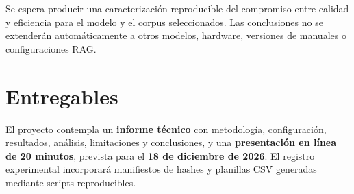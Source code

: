 \documentclass[11pt,a4paper]{article}
\begin{document}
Se espera producir una caracterización reproducible del compromiso entre calidad y eficiencia para el modelo y el corpus seleccionados. Las conclusiones no se extenderán automáticamente a otros modelos, hardware, versiones de manuales o configuraciones RAG.

\section{Entregables}
El proyecto contempla un \textbf{informe técnico} con metodología, configuración, resultados, análisis, limitaciones y conclusiones, y una \textbf{presentación en línea de 20 minutos}, prevista para el \textbf{18 de diciembre de 2026}. El registro experimental incorporará manifiestos de hashes y planillas CSV generadas mediante scripts reproducibles.
\end{document}
